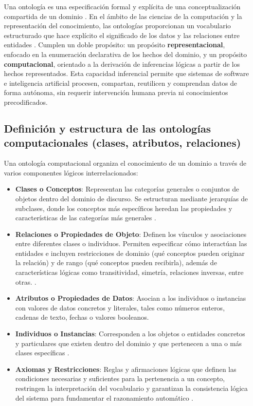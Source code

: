 \documentclass[12pt, letterpaper, oneside]{book}
\begin{document}
Una ontología es una especificación formal y explícita de una conceptualización compartida de un dominio \cite{GruberOntology, OntologyGuarino2009}. En el ámbito de las ciencias de la computación y la representación del conocimiento, las ontologías proporcionan un vocabulario estructurado que hace explícito el significado de los datos y las relaciones entre entidades \cite{Horrocks2003}. Cumplen un doble propósito: un propósito \textbf{representacional}, enfocado en la enumeración declarativa de los hechos del dominio, y un propósito \textbf{computacional}, orientado a la derivación de inferencias lógicas a partir de los hechos representados. Esta capacidad inferencial permite que sistemas de software e inteligencia artificial procesen, compartan, reutilicen y comprendan datos de forma autónoma, sin requerir intervención humana previa ni conocimientos precodificados. 
\subsection{Definición y estructura de las ontologías computacionales (clases, atributos, relaciones)} Una ontología computacional organiza el conocimiento de un dominio a través de varios componentes lógicos interrelacionados: 
\begin{itemize} 
	\item \textbf{Clases o Conceptos}: Representan las categorías generales o conjuntos de objetos dentro del dominio de discurso. Se estructuran mediante jerarquías de subclases, donde los conceptos más específicos heredan las propiedades y características de las categorías más generales \cite{GruberOntology}. 
	\item \textbf{Relaciones o Propiedades de Objeto}: Definen los vínculos y asociaciones entre diferentes clases o individuos. Permiten especificar cómo interactúan las entidades e incluyen restricciones de dominio (qué conceptos pueden originar la relación) y de rango (qué conceptos pueden recibirla), además de características lógicas como transitividad, simetría, relaciones inversas, entre otras. \cite{Horrocks2003}. 
	\item \textbf{Atributos o Propiedades de Datos}: Asocian a los individuos o instancias con valores de datos concretos y literales, tales como números enteros, cadenas de texto, fechas o valores booleanos. 
	\item \textbf{Individuos o Instancias}: Corresponden a los objetos o entidades concretos y particulares que existen dentro del dominio y que pertenecen a una o más clases específicas \cite{GruberOntology}. 
	\item \textbf{Axiomas y Restricciones}: Reglas y afirmaciones lógicas que definen las condiciones necesarias y suficientes para la pertenencia a un concepto, restringen la interpretación del vocabulario y garantizan la consistencia lógica del sistema para fundamentar el razonamiento automático \cite{GruberOntology, Horrocks2003}. 
\end{itemize} 
\end{document}
